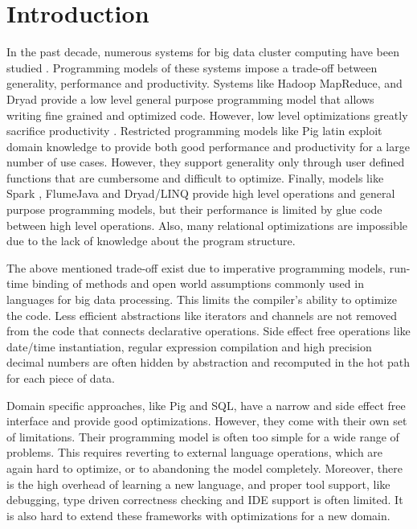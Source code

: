 \section{Introduction}
\label{sec:introduction}

In the past decade, numerous systems for big data cluster computing have been studied \cite{dean_mapreduce:_2008, yu_dryadlinq:_2008-1, olston_pig_2008-1, thusoo_hive_2010-1, spark-nsdi}. Programming models of these systems impose a trade-off between generality, performance and productivity. Systems like Hadoop MapReduce, \cite{hadoop} and Dryad \cite{isard_dryad:_2007} provide a low level general purpose programming model that allows writing fine grained and optimized code. However, low level optimizations greatly sacrifice productivity \cite{chambers_flumejava:_2010}. Restricted programming models like Pig latin \cite{olston_pig_2008-1} exploit domain knowledge to provide both good performance and productivity for a large number of use cases. However, they support generality only through user defined functions that are cumbersome and difficult to optimize. Finally, models like Spark \cite{spark-nsdi}, FlumeJava \cite{chambers_flumejava:_2010} and Dryad/LINQ \cite{yu_dryadlinq:_2008-1} provide high level operations and general purpose programming models, but their performance is limited by glue code between high level operations. Also, many relational optimizations are impossible due to the lack of knowledge about the program structure. 

The above mentioned trade-off exist due to imperative programming models, run-time binding of methods and open world assumptions commonly used in languages for big data processing. This limits the compiler's ability to optimize the code. Less efficient abstractions like iterators and channels are not removed from the code that connects declarative operations. Side effect free operations like date/time instantiation, regular expression compilation and high precision decimal numbers are often hidden by abstraction and recomputed in the hot path for each piece of data. 

Domain specific approaches, like Pig and SQL, have a narrow and side effect free interface and provide good optimizations. However, they come with their own set of limitations. Their programming model is often too simple for a wide range of problems. This requires reverting to external language operations, which are again hard to optimize, or to abandoning the model completely. Moreover, there is the high overhead of learning a new language, and proper tool support, like debugging, type driven correctness checking and IDE support is often limited. It is also hard to extend these frameworks with optimizations for a new domain.

